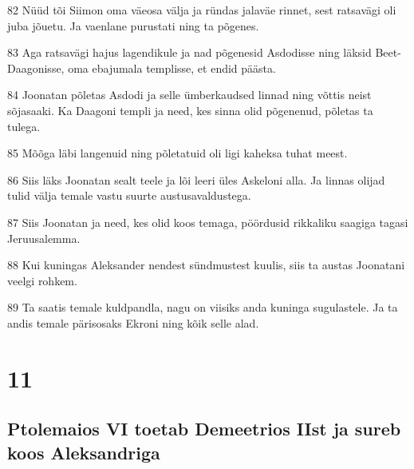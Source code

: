 \par 82 Nüüd tõi Siimon oma väeosa välja ja ründas jalaväe rinnet, sest ratsavägi oli juba jõuetu. Ja vaenlane purustati ning ta põgenes.
\par 83 Aga ratsavägi hajus lagendikule ja nad põgenesid Asdodisse ning läksid Beet-Daagonisse, oma ebajumala templisse, et endid päästa.
\par 84 Joonatan põletas Asdodi ja selle ümberkaudsed linnad ning võttis neist sõjasaaki. Ka Daagoni templi ja need, kes sinna olid põgenenud, põletas ta tulega.
\par 85 Mõõga läbi langenuid ning põletatuid oli ligi kaheksa tuhat meest.
\par 86 Siis läks Joonatan sealt teele ja lõi leeri üles Askeloni alla. Ja linnas olijad tulid välja temale vastu suurte austusavaldustega.
\par 87 Siis Joonatan ja need, kes olid koos temaga, pöördusid rikkaliku saagiga tagasi Jeruusalemma.
\par 88 Kui kuningas Aleksander nendest sündmustest kuulis, siis ta austas Joonatani veelgi rohkem.
\par 89 Ta saatis temale kuldpandla, nagu on viisiks anda kuninga sugulastele. Ja ta andis temale pärisosaks Ekroni ning kõik selle alad.

\chapter{11}

\section*{Ptolemaios VI toetab Demeetrios IIst ja sureb koos Aleksandriga}

